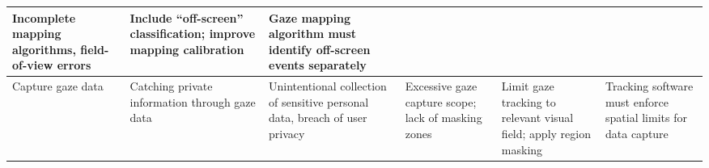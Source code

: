 \documentclass{article}
\begin{document}
\begin{table}[htbp]
{\begin{tabularx}{\textwidth}{|Y|Y|Y|Y|Y|Y|}
      Incomplete mapping algorithms, field-of-view errors &
      Include “off-screen” classification; improve mapping calibration &
      Gaze mapping algorithm must identify off-screen events separately \\
      \hline
      Capture gaze data & Catching private information through gaze data &
      Unintentional collection of sensitive personal data, breach of user privacy &
      Excessive gaze capture scope; lack of masking zones &
      Limit gaze tracking to relevant visual field; apply region masking &
      Tracking software must enforce spatial limits for data capture \\
      \hline
    \end{tabularx}%
  }
\end{table}

\restoregeometry
\end{document}
